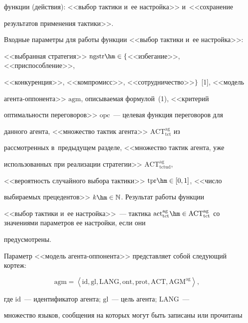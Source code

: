 функции (действия): <<выбор тактики и~ее настройка>> и~<<сохранение 


результатов применения тактики>>. 


  


  Входные параметры для работы функции <<выбор тактики и~ее настройка>>: 


<<выбранная стратегия>> $\mathrm{ngstr}\hm\in\{$<<избегание>>, <<приспособление>>, 


<<конкуренция>>, <<компромисс>>, <<сотрудничество>>$\}$~[1], <<модель  


аген\-та-оп\-по\-нен\-та>> $\mathrm{agm}$, описываемая формулой~(1), <<критерий 


оптимальности переговоров>>  $\mathrm{opc}$~--- целевая функция переговоров для 


данного агента, <<множество тактик агента>> $\mathrm{ACT}_{\mathrm{tct}}^{\mathrm{ag}}$ из 


рассмотренных в~предыдущем разделе, <<множество тактик агента, уже 


использованных при реализации стратегии>> $\mathrm{ACT}_{\mathrm{tctud}}^{\mathrm{ag}}$, 


<<вероятность случайного выбора тактики>> $\mathrm{tpr}\hm\in [0,1]$, <<число 


выбираемых прецедентов>> $k\hm\in \mathbb{N}$. Результат работы функции 


<<выбор тактики и~ее настройка>>~--- тактика $\mathrm{act}_{\mathrm{tct}}^{\mathrm{ag}}\hm\in 


\mathrm{ACT}_{\mathrm{tct}}^{\mathrm{ag}}$ со значениями параметров ее настройки, если они 


предусмотрены. 


  


  Параметр <<модель агента-оппонента>> представляет собой следующий кортеж:


  \begin{equation}


 \mathrm{ agm}=\left \langle \mathrm{id, gl, LANG, ont, prot, ACT, AGM}^{\mathrm{ag}}\right\rangle,


  \label{e1-lis}


  \end{equation}


где $\mathrm{id}$~--- идентификатор агента; $\mathrm{gl}$~--- цель агента; $\mathrm{LANG}$~--- 


множество языков, сообщения на которых могут быть записаны или прочитаны 


